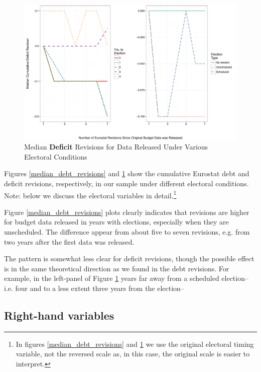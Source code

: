 \documentclass[]{article}
\begin{document}
\begin{figure}
    \begin{center}
        \caption{Median \textbf{Deficit} Revisions for Data Released Under Various Electoral Conditions}
        \label{median_deficit_revisions}
        \includegraphics[scale=0.6]{figures/median_deficit_revisions.pdf}
    \end{center}
\end{figure}

Figures \ref{median_debt_revisions} and \ref{median_deficit_revisions} show the cumulative Eurostat debt and deficit revisions, respectively, in our sample under different electoral conditions. Note: below we discuss the electoral variables in detail.\footnote{In figures \ref{median_debt_revisions} and \ref{median_deficit_revisions} we use the original electoral timing variable, not the reversed scale as, in this case, the original scale is easier to interpret.}

Figure \ref{median_debt_revisions} plots clearly indicates that revisions are higher for budget data released in years with elections, especially when they are unscheduled. The difference appear from about five to seven revisions, e.g. from two years after the first data was released.

The pattern is somewhat less clear for deficit revisions, though the possible effect is in the same theoretical direction as we found in the debt revisions. For example, in the left-panel of Figure \ref{median_deficit_revisions} years far away from a scheduled election--i.e. four and to a less extent three years from the election--

\subsection{Right-hand variables}
\end{document}
